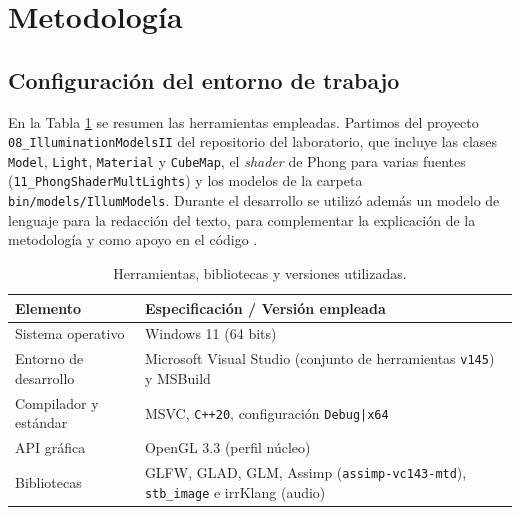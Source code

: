 
\section{Metodología}

\subsection{Configuración del entorno de trabajo}
En la Tabla \ref{tab:requerimientos} se resumen las herramientas empleadas. Partimos del proyecto \texttt{08\_IlluminationModelsII} del repositorio del laboratorio, que incluye las clases \texttt{Model}, \texttt{Light}, \texttt{Material} y \texttt{CubeMap}, el \textit{shader} de Phong para varias fuentes (\texttt{11\_PhongShaderMultLights}) y los modelos de la carpeta \texttt{bin/models/IllumModels}. Durante el desarrollo se utilizó además un modelo de lenguaje para la redacción del texto, para complementar la explicación de la metodología y como apoyo en el código \cite{anthropic2026}.

\begin{table}[H]
\centering
\renewcommand{\arraystretch}{1.25}
\begin{tabular}{|p{4.2cm}|p{10.5cm}|}
\hline
\textbf{Elemento} & \textbf{Especificación / Versión empleada} \\ \hline
Sistema operativo & Windows 11 (64 bits) \\ \hline
Entorno de desarrollo & Microsoft Visual Studio (conjunto de herramientas \texttt{v145}) y MSBuild \\ \hline
Compilador y estándar & MSVC, \texttt{C++20}, configuración \texttt{Debug|x64} \\ \hline
API gráfica & OpenGL 3.3 (perfil núcleo) \\ \hline
Bibliotecas & GLFW, GLAD, GLM, Assimp (\texttt{assimp-vc143-mtd}), \texttt{stb\_image} e irrKlang (audio) \\ \hline
\end{tabular}
\caption{Herramientas, bibliotecas y versiones utilizadas.}
\label{tab:requerimientos}
\end{table}

